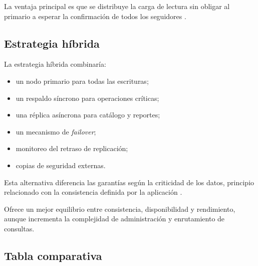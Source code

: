 \documentclass[11pt,a4paper]{article}
\begin{document}
La ventaja principal es que se distribuye la carga de lectura sin obligar al primario a esperar la confirmación de todos los seguidores \cite{margara2023}.

\subsection{Estrategia híbrida}
La estrategia híbrida combinaría:

\begin{itemize}
    \item un nodo primario para todas las escrituras;
    \item un respaldo síncrono para operaciones críticas;
    \item una réplica asíncrona para catálogo y reportes;
    \item un mecanismo de \textit{failover};
    \item monitoreo del retraso de replicación;
    \item copias de seguridad externas.
\end{itemize}

Esta alternativa diferencia las garantías según la criticidad de los datos, principio relacionado con la consistencia definida por la aplicación \cite{li2022}.

Ofrece un mejor equilibrio entre consistencia, disponibilidad y rendimiento, aunque incrementa la complejidad de administración y enrutamiento de consultas.

\subsection{Tabla comparativa}
\end{document}
